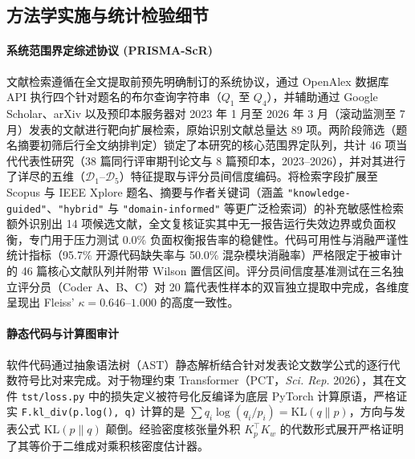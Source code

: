 \subsection{方法学实施与统计检验细节}

\paragraph*{系统范围界定综述协议 (PRISMA-ScR)}
文献检索遵循在全文提取前预先明确制订的系统协议，通过 OpenAlex 数据库 API 执行四个针对题名的布尔查询字符串（$Q_1$ 至 $Q_4$），并辅助通过 Google Scholar、arXiv 以及预印本服务器对 2023 年 1 月至 2026 年 3 月（滚动监测至 7 月）发表的文献进行靶向扩展检索，原始识别文献总量达 89 项。两阶段筛选（题名摘要初筛后行全文纳排判定）锁定了本研究的核心范围界定队列，共计 46 项当代代表性研究（38 篇同行评审期刊论文与 8 篇预印本，2023--2026），并对其进行了详尽的五维（$\mathcal{D}_1$--$\mathcal{D}_5$）特征提取与评分员间信度编码。将检索字段扩展至 Scopus 与 IEEE Xplore 题名、摘要与作者关键词（涵盖 \texttt{"knowledge-guided"}、\texttt{"hybrid"} 与 \texttt{"domain-informed"} 等更广泛检索词）的补充敏感性检索额外识别出 14 项候选文献，全文复核证实其中无一报告运行失效边界或负面权衡，专门用于压力测试 0.0\% 负面权衡报告率的稳健性。代码可用性与消融严谨性统计指标（95.7\% 开源代码缺失率与 50.0\% 混杂模块消融率）严格限定于被审计的 46 篇核心文献队列并附带 Wilson 置信区间。评分员间信度基准测试在三名独立评分员（Coder A、B、C）对 20 篇代表性样本的双盲独立提取中完成，各维度呈现出 Fleiss' $\kappa = 0.646\text{--}1.000$ 的高度一致性。

\paragraph*{静态代码与计算图审计}
软件代码通过抽象语法树（AST）静态解析结合针对发表论文数学公式的逐行代数符号比对来完成。对于物理约束 Transformer（PCT，\textit{Sci. Rep.} 2026），其在文件 \texttt{tst/loss.py} 中的损失定义被符号化反编译为底层 PyTorch 计算原语，严格证实 \texttt{F.kl\_div(p.log(), q)} 计算的是 $\sum q_i \log(q_i / p_i) = \text{KL}(q \parallel p)$，方向与发表公式 $\text{KL}(p \parallel q)$ 颠倒。经验密度核张量外积 $K_p^\top K_w$ 的代数形式展开严格证明了其等价于二维成对乘积核密度估计器。

